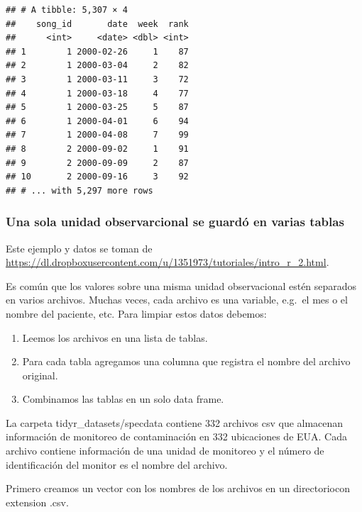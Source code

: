 \documentclass[]{article}
\newenvironment{Shaded}{\begin{snugshade}}{\end{snugshade}}
\newcommand{\KeywordTok}[1]{\textcolor[rgb]{0.13,0.29,0.53}{\textbf{{#1}}}}
\newcommand{\DataTypeTok}[1]{\textcolor[rgb]{0.13,0.29,0.53}{{#1}}}
\newcommand{\CharTok}[1]{\textcolor[rgb]{0.31,0.60,0.02}{{#1}}}
\newcommand{\StringTok}[1]{\textcolor[rgb]{0.31,0.60,0.02}{{#1}}}
\newcommand{\OtherTok}[1]{\textcolor[rgb]{0.56,0.35,0.01}{{#1}}}
\newcommand{\NormalTok}[1]{{#1}}
\providecommand{\tightlist}{%
  \setlength{\itemsep}{0pt}\setlength{\parskip}{0pt}}
\begin{document}
\begin{verbatim}
## # A tibble: 5,307 × 4
##    song_id       date  week  rank
##      <int>     <date> <dbl> <int>
## 1        1 2000-02-26     1    87
## 2        1 2000-03-04     2    82
## 3        1 2000-03-11     3    72
## 4        1 2000-03-18     4    77
## 5        1 2000-03-25     5    87
## 6        1 2000-04-01     6    94
## 7        1 2000-04-08     7    99
## 8        2 2000-09-02     1    91
## 9        2 2000-09-09     2    87
## 10       2 2000-09-16     3    92
## # ... with 5,297 more rows
\end{verbatim}

\subsubsection{Una sola unidad observarcional se guardó en varias
tablas}\label{una-sola-unidad-observarcional-se-guardo-en-varias-tablas}

Este ejemplo y datos se toman de
\url{https://dl.dropboxusercontent.com/u/1351973/tutoriales/intro_r_2.html}.

Es común que los valores sobre una misma unidad observacional estén
separados en varios archivos. Muchas veces, cada archivo es una
variable, e.g.~el mes o el nombre del paciente, etc. Para limpiar estos
datos debemos:

\begin{enumerate}
\def\labelenumi{\arabic{enumi}.}
\tightlist
\item
  Leemos los archivos en una lista de tablas.
\item
  Para cada tabla agregamos una columna que registra el nombre del
  archivo original.
\item
  Combinamos las tablas en un solo data frame.
\end{enumerate}

La carpeta tidyr\_datasets/specdata contiene 332 archivos csv que
almacenan información de monitoreo de contaminación en 332 ubicaciones
de EUA. Cada archivo contiene información de una unidad de monitoreo y
el número de identificación del monitor es el nombre del archivo.

Primero creamos un vector con los nombres de los archivos en un
directoriocon extension .csv.

\begin{Shaded}
\end{Shaded}
\end{document}
